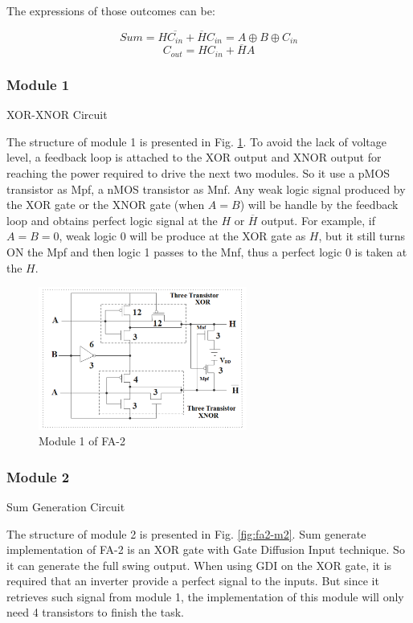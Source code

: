 \documentclass[conference]{IEEEtran}
\begin{document}
The expressions of those outcomes can be:

\[
	Sum = H\overline{C_{in}} + \overline{H}C_{in} = A \oplus B \oplus C_{in}
\]
\[
	C_{out} = HC_{in} + \overline{H}A
\]

\subsubsection{Module 1}XOR-XNOR Circuit

The structure of module 1 is presented in Fig. \ref{fig:fa2-m1}.
To avoid the lack of voltage level, a feedback loop is attached to the XOR output and XNOR output
for reaching the power required to drive the next two modules. So it use a pMOS transistor as Mpf, a nMOS transistor as Mnf.
Any weak logic signal produced by the XOR gate or the XNOR gate (when \(A=B\))
will be handle by the feedback loop and obtains perfect logic signal at the \(H\) or $\overline{H}$ output.
For example, if \(A = B = 0\), weak logic 0 will be produce at the XOR gate as \(H\),
but it still turns ON the Mpf and then logic 1 passes to the Mnf, thus a perfect logic 0 is taken at the \(H\).

\begin{figure}[!hb]
	\centering
	\includegraphics[width=2.7in]{fa2-m1.png}
	\caption{Module 1 of FA-2}
	\label{fig:fa2-m1}
\end{figure}

\subsubsection{Module 2} Sum Generation Circuit

The structure of module 2 is presented in Fig. \ref{fig:fa2-m2}.
Sum generate implementation of FA-2 is an XOR gate with Gate Diffusion Input technique.
So it can generate the full swing output.
When using GDI on the XOR gate, it is required that an inverter provide a perfect signal to the inputs.
But since it retrieves such signal from module 1, the implementation of this module will only need 4 transistors to finish the task.
\end{document}
